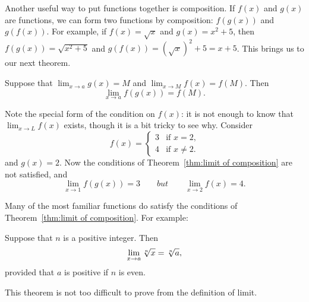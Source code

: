 Another useful way to put functions together is
composition. If $f(x)$ and $g(x)$ are
functions, we can form two functions by composition: $f(g(x))$ and
$g(f(x))$. For example, if $f(x)=\sqrt{x}$ and $g(x)=x^2+5$, then
$f(g(x))=\sqrt{x^2+5}$ and $g(f(x))=(\sqrt{x})^2+5=x+5$.  This brings
us to our next theorem.

\begin{theorem}\label{thm:limit of composition}
Suppose that $\lim_{x\to a}g(x)=M$ and $\lim_{x\to M}f(x) = f(M)$. Then
\[
\lim_{x\to a} f(g(x)) = f(M).
\]
\end{theorem}

Note the special form of the condition on $f(x)$: it is not enough to
know that $\lim_{x\to L}f(x)$ exists, though it is a bit tricky to see
why. Consider
\[
f(x) =\begin{cases}
3 & \text{if $x=2$,}\\
4 & \text{if $x\ne 2$.}
\end{cases}
\]
and $g(x) = 2$. Now the conditions of Theorem~\ref{thm:limit of
  composition} are not satisfied, and
\[
\lim_{x\to 1} f(g(x)) = 3 \qquad{but}\qquad \lim_{x\to 2} f(x) = 4.
\]


Many of the most familiar functions do satisfy the conditions of
Theorem~\ref{thm:limit of composition}. For example:

\begin{theorem}
Suppose that $n$ is a positive integer. Then
$$\lim_{x\to a}\root n\of{x} = \root n\of{a},$$
provided that $a$ is positive if $n$ is even.
\label{thm:continuity of roots}
\end{theorem}

This theorem is not too difficult to prove from the definition of limit.








